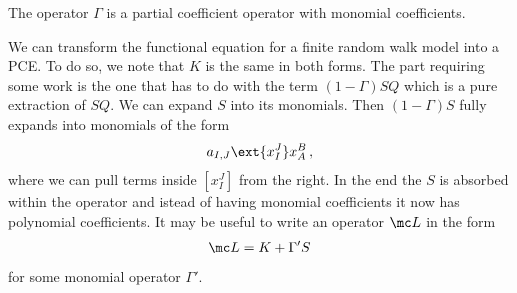 \begin{exa} The operator $\Gamma$ is a partial coefficient operator with monomial coefficients.
\end{exa}

\begin{exa} We can transform the functional equation for a finite random walk model into a PCE. To do so, we note that $K$ is the same in both forms. The part requiring some work is the one that has to do with the term $(1-\Gamma)SQ$ which is a pure extraction of $SQ$. We can expand $S$ into its monomials. Then $(1-\Gamma)S$ fully expands into monomials of the form
\begin{align}
	a_{I,J}\ext{x_I^J}x_A^B\,,
\end{align}
where we can pull terms inside $[x_I^J]$ from the right. In the end the $S$ is absorbed within the operator and istead of having monomial coefficients it now has polynomial coefficients. It may be useful to write an operator $\mc L$ in the form
\begin{align}
	\mc L = K + \Gamma'S
\end{align}
for some monomial operator $\Gamma'$.
\end{exa}

